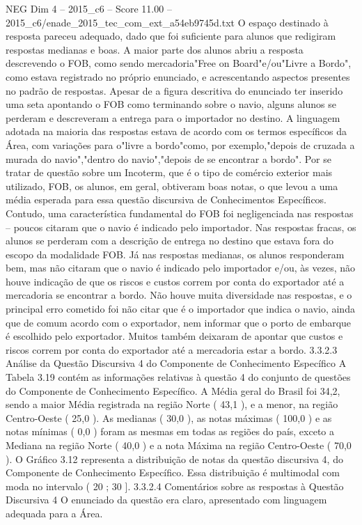 \begin{textsample}{NEG Dim 4 – 2015\_c6 – Score 11.00 – 2015\_c6/enade\_2015\_tec\_com\_ext\_a54eb9745d.txt}
O espaço destinado à resposta pareceu adequado, dado que foi suficiente para alunos que redigiram respostas medianas e boas.
A maior parte dos alunos abriu a resposta descrevendo o FOB, como sendo mercadoria"Free on Board"e/ou"Livre a Bordo", como estava registrado no próprio enunciado, e acrescentando aspectos presentes no padrão de respostas.
Apesar de a figura descritiva do enunciado ter inserido uma seta apontando o FOB como terminando sobre o navio, alguns alunos se perderam e descreveram a entrega para o importador no destino.
A linguagem adotada na maioria das respostas estava de acordo com os termos específicos da Área, com variações para o"livre a bordo"como, por exemplo,"depois de cruzada a murada do navio","dentro do navio","depois de se encontrar a bordo".
Por se tratar de questão sobre um Incoterm, que é o tipo de comércio exterior mais utilizado, FOB, os alunos, em geral, obtiveram boas notas, o que levou a uma média esperada para essa questão discursiva de Conhecimentos Específicos.
Contudo, uma característica fundamental do FOB foi negligenciada nas respostas – poucos citaram que o navio é indicado pelo importador.
Nas respostas fracas, os alunos se perderam com a descrição de entrega no destino que estava fora do escopo da modalidade FOB.
Já nas respostas medianas, os alunos responderam bem, mas não citaram que o navio é indicado pelo importador e/ou, às vezes, não houve indicação de que os riscos e custos correm por conta do exportador até a mercadoria se encontrar a bordo.
Não houve muita diversidade nas respostas, e o principal erro cometido foi não citar que é o importador que indica o navio, ainda que de comum acordo com o exportador, nem informar que o porto de embarque é escolhido pelo exportador.
Muitos também deixaram de apontar que custos e riscos correm por conta do exportador até a mercadoria estar a bordo. 3.3.2.3 Análise da Questão Discursiva 4 do Componente de Conhecimento Específico A Tabela 3.19 contém as informações relativas à questão 4 do conjunto de questões do Componente de Conhecimento Específico.
A Média geral do Brasil foi 34,2, sendo a maior Média registrada na região Norte ( 43,1 ), e a menor, na região Centro-Oeste ( 25,0 ).
As medianas ( 30,0 ), as notas máximas ( 100,0 ) e as notas mínimas ( 0,0 ) foram as mesmas em todas as regiões do país, exceto a Mediana na região Norte ( 40,0 ) e a nota Máxima na região Centro-Oeste ( 70,0 ).
O Gráfico 3.12 representa a distribuição de notas da questão discursiva 4, do Componente de Conhecimento Específico.
Essa distribuição é multimodal com moda no intervalo ( 20 ; 30 ]. 3.3.2.4 Comentários sobre as respostas à Questão Discursiva 4 O enunciado da questão era claro, apresentado com linguagem adequada para a Área.

\end{textsample}
